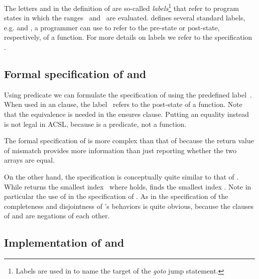 

The letters  and  in the definition of \Equal
are so-called  \emph{labels}\footnote{
    Labels are used in \isoc to name the target of the \emph{goto}
    jump statement.
}
that refer to program states in which the ranges~ and~ are evaluated.
\framac defines several standard labels, e.g.\xspace {}
and ,
a programmer can use to refer to the pre-state or post-state,
respectively, of a function.
For more details on labels we refer to the \acsl
specification \cite[\S 2.6.9]{ACSLSpec}.


\subsection{Formal specification of \equal and \mismatch}

Using predicate  we can formulate the specification of 
using the predefined label~. 
When used in an  clause, the label~ refers to the post-state of a function.
Note that the equivalence is needed in the ensures clause.
Putting an equality instead is not legal in ACSL,
because \Equal is a predicate, not a function.




The formal specification of 
is more complex than that of  because the return value of mismatch
provides more information than just reporting whether the two arrays are equal.



On the other hand, the specification is conceptually quite similar to that of .
%
While \findii returns the smallest index~ where  holds,
\mismatch finds the smallest index .
Note in particular the use of \Equal in the specification of \mismatch.
As in the specification of \findii
the completeness and disjointness of \mismatch's behaviors is quite obvious,
because the  clauses of
 and  are negations of each other.


\subsection{Implementation of \equal and \mismatch}

